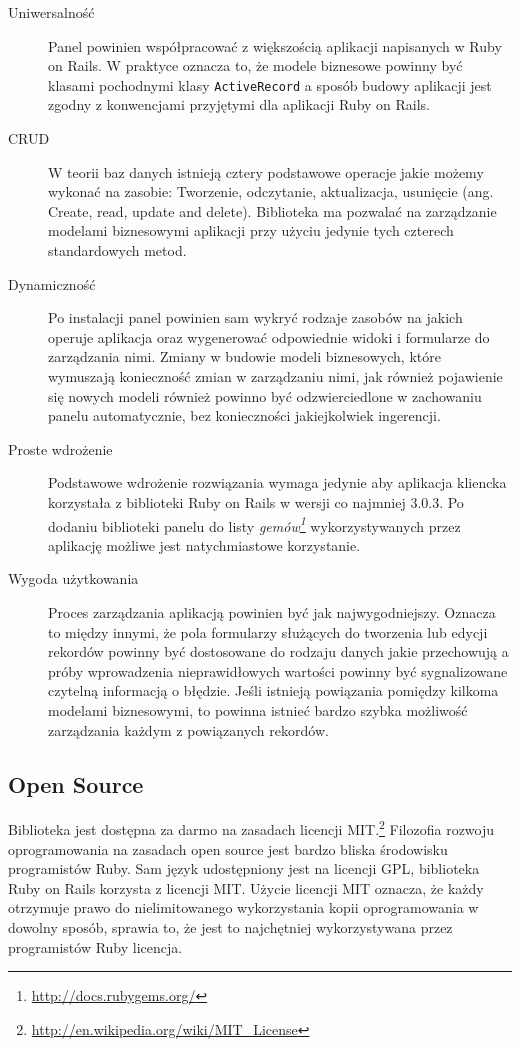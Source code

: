   \begin{description}
    \item[Uniwersalność] Panel powinien współpracować z większością aplikacji napisanych w Ruby on Rails. W praktyce oznacza to, że modele biznesowe powinny być klasami pochodnymi klasy \texttt{ActiveRecord} a sposób budowy aplikacji jest zgodny z konwencjami przyjętymi dla aplikacji Ruby on Rails.
    \item[CRUD] W teorii baz danych istnieją cztery podstawowe operacje jakie możemy wykonać na zasobie: Tworzenie, odczytanie, aktualizacja, usunięcie (ang. Create, read, update and delete). Biblioteka ma pozwalać na zarządzanie modelami biznesowymi aplikacji przy użyciu jedynie tych czterech standardowych metod.
    \item[Dynamiczność] Po instalacji panel powinien sam wykryć rodzaje zasobów na jakich operuje aplikacja oraz wygenerować odpowiednie widoki i formularze do zarządzania nimi. Zmiany w budowie modeli biznesowych, które wymuszają konieczność zmian w zarządzaniu nimi, jak również pojawienie się nowych modeli również powinno być odzwierciedlone w zachowaniu panelu automatycznie, bez konieczności jakiejkolwiek ingerencji.
    \item[Proste wdrożenie] Podstawowe wdrożenie rozwiązania wymaga jedynie aby aplikacja kliencka korzystała z biblioteki Ruby on Rails w wersji co najmniej 3.0.3. Po dodaniu biblioteki panelu do listy \emph{gemów\footnote{\url{http://docs.rubygems.org/}}} wykorzystywanych przez aplikację możliwe jest natychmiastowe korzystanie.
    \item[Wygoda użytkowania] Proces zarządzania aplikacją powinien być jak najwygodniejszy. Oznacza to między innymi, że pola formularzy służących do tworzenia lub edycji rekordów powinny być dostosowane do rodzaju danych jakie przechowują a próby wprowadzenia nieprawidłowych wartości powinny być sygnalizowane czytelną informacją o błędzie. Jeśli istnieją powiązania pomiędzy kilkoma modelami biznesowymi, to powinna istnieć bardzo szybka możliwość zarządzania każdym z powiązanych rekordów.
  \end{description}
  
  \subsection{Open Source}
    Biblioteka jest dostępna za darmo na zasadach licencji MIT.\footnote{\url{http://en.wikipedia.org/wiki/MIT_License}} Filozofia rozwoju oprogramowania na zasadach open source jest bardzo bliska środowisku programistów Ruby. Sam język udostępniony jest na licencji GPL, biblioteka Ruby on Rails korzysta z licencji MIT. Użycie licencji MIT oznacza, że każdy otrzymuje prawo do nielimitowanego wykorzystania kopii oprogramowania w dowolny sposób, sprawia to, że jest to najchętniej wykorzystywana przez programistów Ruby licencja.
    
